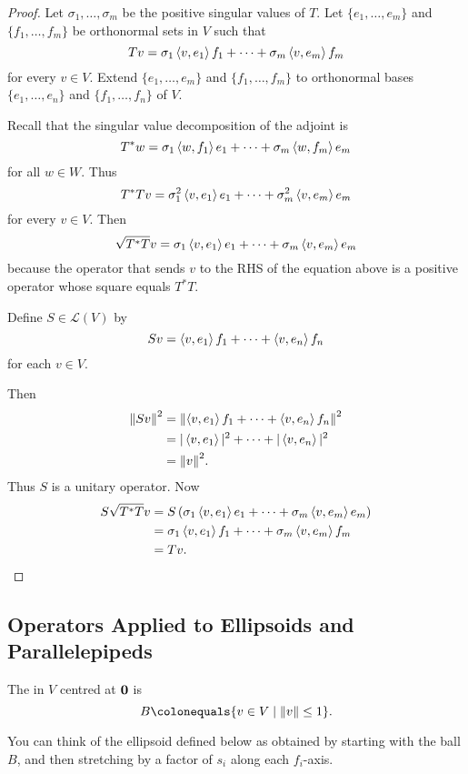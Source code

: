 \begin{proof}
Let $\sigma_1,\dots,\sigma_m$ be the positive singular values of $T$. Let $\{e_1,\dots,e_m\}$ and $\{f_1,\dots,f_m\}$ be orthonormal sets in $V$ such that
\[Tv=\sigma_1\left\langle v,e_1\right\rangle f_1+\cdots+\sigma_m\left\langle v,e_m\right\rangle f_m\]
for every $v\in V$. Extend $\{e_1,\dots,e_m\}$ and $\{f_1,\dots,f_m\}$ to orthonormal bases $\{e_1,\dots,e_n\}$ and $\{f_1,\dots,f_n\}$ of $V$.

Recall that the singular value decomposition of the adjoint is
\[T^*w=\sigma_1\left\langle w,f_1\right\rangle e_1+\cdots+\sigma_m\left\langle w,f_m\right\rangle e_m\]
for all $w\in W$. Thus
\[T^*Tv=\sigma_1^2\left\langle v,e_1\right\rangle e_1+\cdots+\sigma_m^2\left\langle v,e_m\right\rangle e_m\]
for every $v\in V$. Then
\[\sqrt{T^*T}v=\sigma_1\left\langle v,e_1\right\rangle e_1+\cdots+\sigma_m\left\langle v,e_m\right\rangle e_m\]
because the operator that sends $v$ to the RHS of the equation above is a positive operator whose square equals $T^*T$.

\begin{claim}
Define $S\in\mathcal{L}(V)$ by
\[Sv=\left\langle v,e_1\right\rangle f_1+\cdots+\left\langle v,e_n\right\rangle f_n\]
for each $v\in V$.
\end{claim}

Then
\begin{align*}
\norm{Sv}^2&=\norm{\left\langle v,e_1\right\rangle f_1+\cdots+\left\langle v,e_n\right\rangle f_n}^2\\
&=|\left\langle v,e_1\right\rangle|^2+\cdots+|\left\langle v,e_n\right\rangle|^2\\
&=\norm{v}^2.
\end{align*}
Thus $S$ is a unitary operator. Now
\begin{align*}
S\sqrt{T^*T}v&=S\left(\sigma_1\left\langle v,e_1\right\rangle e_1+\cdots+\sigma_m\left\langle v,e_m\right\rangle e_m\right)\\
&=\sigma_1\left\langle v,e_1\right\rangle f_1+\cdots+\sigma_m\left\langle v,e_m\right\rangle f_m\\
&=Tv.
\end{align*}
\end{proof}

\subsection{Operators Applied to Ellipsoids and Parallelepipeds}
\begin{definition}[Ball]
The  in $V$ centred at $\vb{0}$ is
\[B\colonequals\{v\in V\mid\norm{v}\le1\}.\] 
\end{definition}

You can think of the ellipsoid defined below as obtained by starting with the ball $B$, and then stretching by a factor of $s_i$ along each $f_i$-axis.

